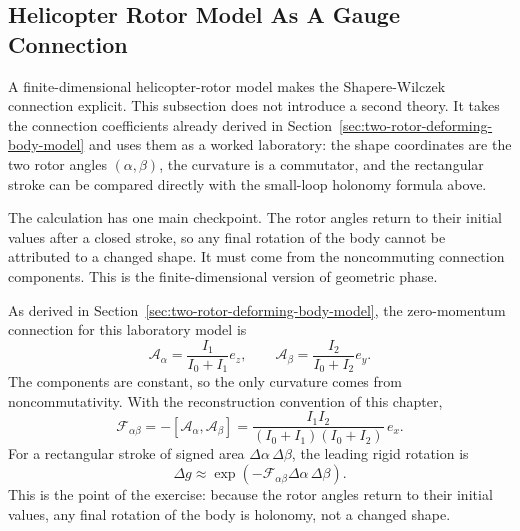 \subsection{Helicopter Rotor Model As A Gauge Connection}
\label{sec:lab-helicopter-gauge}

A finite-dimensional helicopter-rotor model makes the Shapere-Wilczek
connection explicit.
This subsection does not introduce a second theory. It takes the connection
coefficients already derived in Section~\ref{sec:two-rotor-deforming-body-model}
and uses them as a worked laboratory: the shape coordinates are the two rotor
angles \((\alpha,\beta)\), the curvature is a commutator, and the rectangular
stroke can be compared directly with the small-loop holonomy formula above.

The calculation has one main checkpoint. The rotor angles return to their
initial values after a closed stroke, so any final rotation of the body cannot
be attributed to a changed shape. It must come from the noncommuting
connection components. This is the finite-dimensional version of geometric
phase.

As derived in Section~\ref{sec:two-rotor-deforming-body-model}, the
zero-momentum connection for this laboratory model is
\[
  \mathcal A_\alpha=
  \frac{I_1}{I_0+I_1}e_z,\qquad
  \mathcal A_\beta=
  \frac{I_2}{I_0+I_2}e_y.
\]
The components are constant, so the only curvature comes from noncommutativity.
With the reconstruction convention of this chapter,
\[
  \mathcal F_{\alpha\beta}
  =
  -[\mathcal A_\alpha,\mathcal A_\beta]
  =
  \frac{I_1I_2}{(I_0+I_1)(I_0+I_2)}\,e_x.
\]
For a rectangular stroke of signed area
\(\Delta\alpha\,\Delta\beta\), the leading rigid rotation is
\[
  \Delta g
  \approx
  \exp\left(
    -\mathcal F_{\alpha\beta}\Delta\alpha\,\Delta\beta
  \right).
\]
This is the point of the exercise: because the rotor angles return to their
initial values, any final rotation of the body is holonomy, not a changed
shape.

